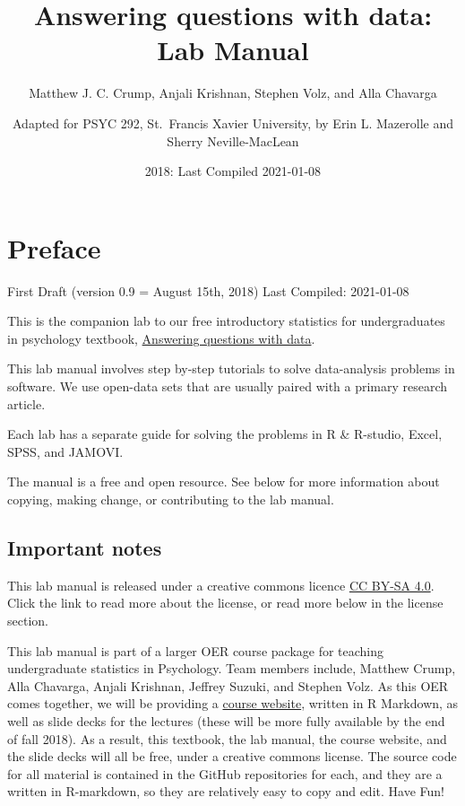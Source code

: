 \documentclass[]{book}
\title{Answering questions with data: Lab Manual}
\author{Matthew J. C. Crump, Anjali Krishnan, Stephen Volz, and Alla Chavarga \and Adapted for PSYC 292, St.~Francis Xavier University, by Erin L.
Mazerolle and Sherry Neville-MacLean}
\date{2018: Last Compiled 2021-01-08}
\begin{document}
\maketitle

{
\setcounter{tocdepth}{1}
\tableofcontents
}
\chapter*{Preface}\label{preface}

First Draft (version 0.9 = August 15th, 2018) Last Compiled: 2021-01-08

This is the companion lab to our free introductory statistics for
undergraduates in psychology textbook,
\href{https://crumplab.github.io/statistics/}{Answering questions with
data}.

This lab manual involves step by-step tutorials to solve data-analysis
problems in software. We use open-data sets that are usually paired with
a primary research article.

Each lab has a separate guide for solving the problems in R \& R-studio,
Excel, SPSS, and JAMOVI.

The manual is a free and open resource. See below for more information
about copying, making change, or contributing to the lab manual.

\section{Important notes}\label{important-notes}

This lab manual is released under a creative commons licence
\href{https://creativecommons.org/licenses/by-sa/4.0/}{CC BY-SA 4.0}.
Click the link to read more about the license, or read more below in the
license section.

This lab manual is part of a larger OER course package for teaching
undergraduate statistics in Psychology. Team members include, Matthew
Crump, Alla Chavarga, Anjali Krishnan, Jeffrey Suzuki, and Stephen Volz.
As this OER comes together, we will be providing a
\href{https://crumplab.github.io/psyc3400/}{course website}, written in
R Markdown, as well as slide decks for the lectures (these will be more
fully available by the end of fall 2018). As a result, this textbook,
the lab manual, the course website, and the slide decks will all be
free, under a creative commons license. The source code for all material
is contained in the GitHub repositories for each, and they are a written
in R-markdown, so they are relatively easy to copy and edit. Have Fun!
\end{document}
